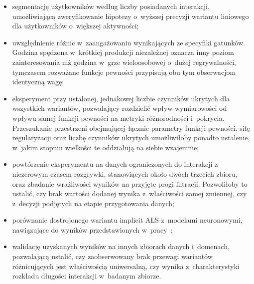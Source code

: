\begin{itemize}
    \item segmentację użytkowników według liczby posiadanych interakcji,
    umożliwiającą zweryfikowanie hipotezy o~wyższej precyzji wariantu liniowego
    dla użytkowników o~większej aktywności;

    \item uwzględnienie różnic w~zaangażowaniu wynikających ze specyfiki gatunków. Godzina spędzona w~krótkiej produkcji niezależnej oznacza inny poziom zainteresowania niż godzina w~grze wieloosobowej o~dużej regrywalności, tymczasem rozważane funkcje pewności przypisują obu tym obserwacjom identyczną wagę;

    \item eksperyment przy ustalonej, jednakowej liczbie czynników ukrytych dla
    wszystkich wariantów, pozwalający rozdzielić wpływ wymiarowości od wpływu
    samej funkcji pewności na metryki różnorodności i~pokrycia. Przeszukanie przestrzeni obejmującej łącznie parametry funkcji pewności, siłę regularyzacji oraz liczbę czynników ukrytych umożliwiłoby ponadto ustalenie, w~jakim stopniu wielkości te oddziałują na siebie wzajemnie;

    \item powtórzenie eksperymentu na danych ograniczonych do interakcji z niezerowym czasem rozgrywki, stanowiących około dwóch trzecich zbioru, oraz zbadanie wrażliwości wyników na przyjęte progi filtracji. Pozwoliłoby to ustalić, czy brak wartości dodanej wynika z~właściwości samej zmiennej, czy z~decyzji podjętych na etapie przygotowania danych;

    \item porównanie dostrojonego wariantu implicit ALS z~modelami neuronowymi,
    nawiązujące do wyników przedstawionych w~pracy~\cite{rendle2021revisiting};

    \item walidację uzyskanych wyników na innych zbiorach danych i~domenach,
    pozwalającą ustalić, czy zaobserwowany brak przewagi wariantów
    różnicujących jest właściwością uniwersalną, czy wynika z~charakterystyki
    rozkładu długości interakcji w~badanym zbiorze.
\end{itemize}